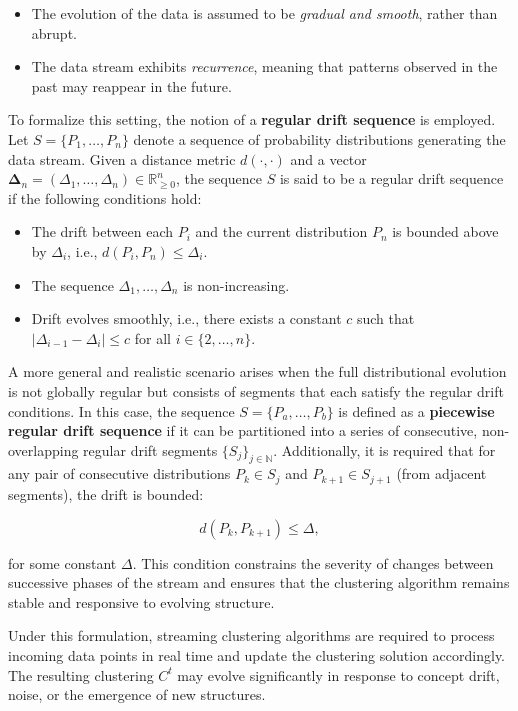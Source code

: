 \begin{itemize}
    \item The evolution of the data is assumed to be \emph{gradual and smooth}, rather
          than abrupt.
    \item The data stream exhibits \emph{recurrence}, meaning that patterns observed in
          the past may reappear in the future.
\end{itemize}

To formalize this setting, the notion of a \textbf{regular drift sequence} is
employed. Let $ S = \{P_1, \dots, P_n\} $ denote a sequence of probability
distributions generating the data stream. Given a distance metric $ d(\cdot,
\cdot) $ and a vector $ \boldsymbol{\Delta}_n = (\Delta_1, \dots, \Delta_n)
\in \mathbb{R}_{\ge 0}^n $, the sequence $ S $ is said to be a regular drift
sequence if the following conditions hold:

\begin{itemize}
    \item The drift between each $ P_i $ and the current distribution $ P_n $ is
          bounded above by $ \Delta_i $, i.e., $ d(P_i, P_n) \le \Delta_i $.
    \item The sequence $ \Delta_1, \dots, \Delta_n $ is non-increasing.
    \item Drift evolves smoothly, i.e., there exists a constant $ c $ such that $
          |\Delta_{i-1} - \Delta_i| \le c $ for all $ i \in \{2, \dots, n\} $.
\end{itemize}

A more general and realistic scenario arises when the full distributional
evolution is not globally regular but consists of segments that each satisfy
the regular drift conditions. In this case, the sequence $ S = \{P_a, \dots,
P_b\} $ is defined as a \textbf{piecewise regular drift sequence} if it can be
partitioned into a series of consecutive, non-overlapping regular drift
segments $ \{S_j\}_{j \in \mathbb{N}} $. Additionally, it is required that
for any pair of consecutive distributions $ P_k \in S_j $ and $ P_{k+1} \in
S_{j+1} $ (from adjacent segments), the drift is bounded:

\[
    d(P_k, P_{k+1}) \le \Delta,
\]

for some constant $ \Delta $. This condition constrains the severity of
changes between successive phases of the stream and ensures that the clustering
algorithm remains stable and responsive to evolving structure.

Under this formulation, streaming clustering algorithms are required to process
incoming data points in real time and update the clustering solution
accordingly. The resulting clustering $ C^t $ may evolve significantly in
response to concept drift, noise, or the emergence of new structures.

